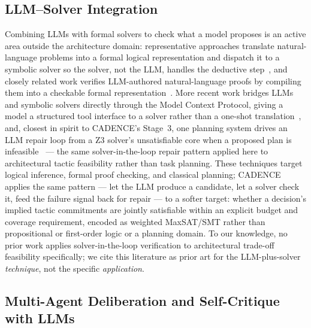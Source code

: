 \documentclass[lettersize,journal]{IEEEtran}
\begin{document}
\subsection{LLM--Solver Integration}

Combining LLMs with formal solvers to check what a model proposes is an active area outside the architecture domain: representative approaches translate natural-language problems into a formal logical representation and dispatch it to a symbolic solver so the solver, not the LLM, handles the deductive step~\cite{pan2023logiclm}, and closely related work verifies LLM-authored natural-language proofs by compiling them into a checkable formal representation~\cite{olausson2023linc}. More recent work bridges LLMs and symbolic solvers directly through the Model Context Protocol, giving a model a structured tool interface to a solver rather than a one-shot translation~\cite{szeider2025mcpsolver}, and, closest in spirit to CADENCE's Stage~3, one planning system drives an LLM repair loop from a Z3 solver's unsatisfiable core when a proposed plan is infeasible~\cite{hao2024planningz3} --- the same solver-in-the-loop repair pattern applied here to architectural tactic feasibility rather than task planning. These techniques target logical inference, formal proof checking, and classical planning; CADENCE applies the same pattern --- let the LLM produce a candidate, let a solver check it, feed the failure signal back for repair --- to a softer target: whether a decision's implied tactic commitments are jointly satisfiable within an explicit budget and coverage requirement, encoded as weighted MaxSAT/SMT rather than propositional or first-order logic or a planning domain. To our knowledge, no prior work applies solver-in-the-loop verification to architectural trade-off feasibility specifically; we cite this literature as prior art for the LLM-plus-solver \emph{technique}, not the specific \emph{application}.

\subsection{Multi-Agent Deliberation and Self-Critique with LLMs}
\end{document}
